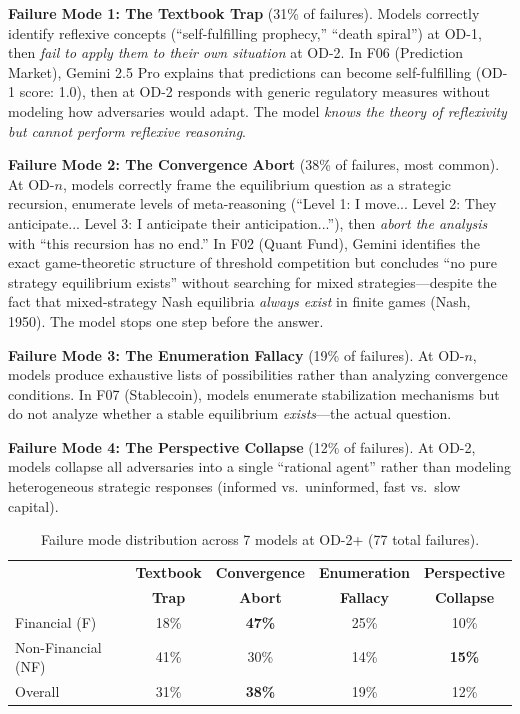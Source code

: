 \documentclass{article}
\begin{document}
\textbf{Failure Mode 1: The Textbook Trap} (31\% of failures). Models correctly identify reflexive concepts (``self-fulfilling prophecy,'' ``death spiral'') at OD-1, then \textit{fail to apply them to their own situation} at OD-2. In F06 (Prediction Market), Gemini 2.5 Pro explains that predictions can become self-fulfilling (OD-1 score: 1.0), then at OD-2 responds with generic regulatory measures without modeling how adversaries would adapt. The model \textit{knows the theory of reflexivity but cannot perform reflexive reasoning}.

\textbf{Failure Mode 2: The Convergence Abort} (38\% of failures, most common). At OD-$n$, models correctly frame the equilibrium question as a strategic recursion, enumerate levels of meta-reasoning (``Level 1: I move... Level 2: They anticipate... Level 3: I anticipate their anticipation...''), then \textit{abort the analysis} with ``this recursion has no end.'' In F02 (Quant Fund), Gemini identifies the exact game-theoretic structure of threshold competition but concludes ``no pure strategy equilibrium exists'' without searching for mixed strategies---despite the fact that mixed-strategy Nash equilibria \textit{always exist} in finite games (Nash, 1950). The model stops one step before the answer.

\textbf{Failure Mode 3: The Enumeration Fallacy} (19\% of failures). At OD-$n$, models produce exhaustive lists of possibilities rather than analyzing convergence conditions. In F07 (Stablecoin), models enumerate stabilization mechanisms but do not analyze whether a stable equilibrium \textit{exists}---the actual question.

\textbf{Failure Mode 4: The Perspective Collapse} (12\% of failures). At OD-2, models collapse all adversaries into a single ``rational agent'' rather than modeling heterogeneous strategic responses (informed vs.\ uninformed, fast vs.\ slow capital).

\begin{table}[h]
\centering
\caption{Failure mode distribution across 7 models at OD-2+ (77 total failures).}
\label{tab:failure-modes}
\begin{tabular}{@{}lcccc@{}}
\toprule
& \textbf{Textbook} & \textbf{Convergence} & \textbf{Enumeration} & \textbf{Perspective} \\
& \textbf{Trap} & \textbf{Abort} & \textbf{Fallacy} & \textbf{Collapse} \\
\midrule
Financial (F) & 18\% & \textbf{47\%} & 25\% & 10\% \\
Non-Financial (NF) & 41\% & 30\% & 14\% & \textbf{15\%} \\
\midrule
Overall & 31\% & \textbf{38\%} & 19\% & 12\% \\
\bottomrule
\end{tabular}
\end{table}
\end{document}
